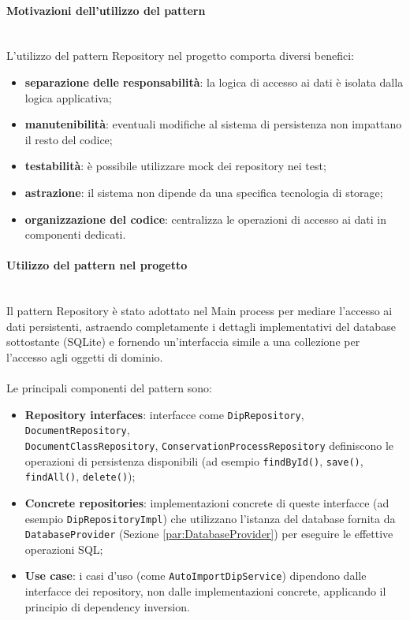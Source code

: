 \documentclass[a4paper,12pt]{article}
\begin{document}
{{{                \paragraph{Motivazioni dell’utilizzo del pattern}\mbox{}\\
                L’utilizzo del pattern Repository nel progetto comporta diversi benefici:
                \begin{itemize}
                    \item \textbf{separazione delle responsabilità}: la logica di accesso ai dati è isolata dalla logica applicativa;
                    \item \textbf{manutenibilità}: eventuali modifiche al sistema di persistenza non impattano il resto del codice;
                    \item \textbf{testabilità}: è possibile utilizzare mock dei repository nei test;
                    \item \textbf{astrazione}: il sistema non dipende da una specifica tecnologia di storage;
                    \item \textbf{organizzazione del codice}: centralizza le operazioni di accesso ai dati in componenti dedicati.
                \end{itemize}
                
                \paragraph{Utilizzo del pattern nel progetto}\mbox{}\\
                Il pattern Repository è stato adottato nel Main process per mediare l'accesso ai dati persistenti, astraendo completamente i dettagli implementativi del database sottostante (SQLite) e fornendo un'interfaccia simile a una collezione per l'accesso agli oggetti di dominio.\\
                \\
                Le principali componenti del pattern sono:
                \begin{itemize}
                    \item \textbf{Repository interfaces}: interfacce come \texttt{DipRepository}, \texttt{DocumentRepository},\\ \texttt{DocumentClassRepository}, \texttt{ConservationProcessRepository} definiscono le operazioni di persistenza disponibili (ad esempio \texttt{findById()}, \texttt{save()}, \texttt{findAll()}, \texttt{delete()});
                    \item \textbf{Concrete repositories}: implementazioni concrete di queste interfacce (ad esempio \texttt{DipRepositoryImpl}) che utilizzano l'istanza del database fornita da \texttt{DatabaseProvider} (Sezione \ref{par:DatabaseProvider}) per eseguire le effettive operazioni SQL;
                    \item \textbf{Use case}: i casi d'uso (come \texttt{AutoImportDipService}) dipendono dalle interfacce dei repository, non dalle implementazioni concrete, applicando il principio di dependency inversion.
                \end{itemize}
                
}}}
\end{document}
